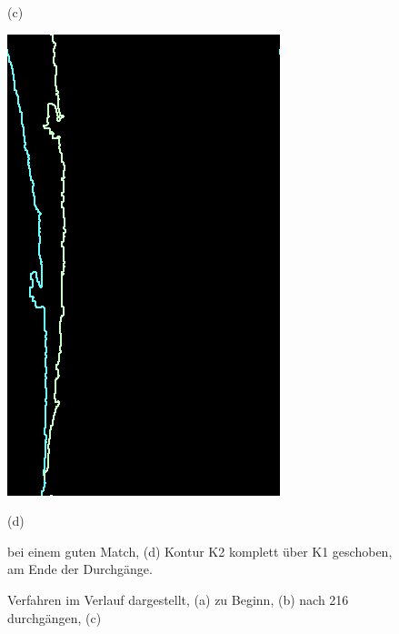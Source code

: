\begin{figure}[H]
\begin{minipage}{0.24\textwidth}
        \caption*{(c)}
    \end{minipage}\hfill
    \begin{minipage}{0.24\textwidth}
        \centering
        \includegraphics[width=\textwidth]{images/592_match.png} %
        \caption*{(d)}
    \end{minipage}\hfill
    \caption{Verfahren im Verlauf dargestellt, (a) zu Beginn, (b) nach 216 durchgängen, (c) }
    bei einem guten Match, (d) Kontur K2 komplett über K1 geschoben, 
    am Ende der Durchgänge.
    \label{fig:stitching_all}
\end{figure}

